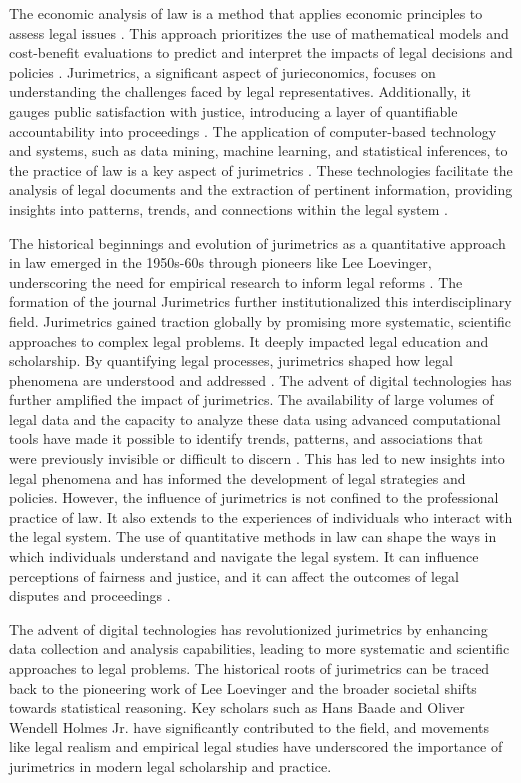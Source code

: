 The economic analysis of law is a method that applies economic principles to assess legal issues \cite{1023071190721}. This approach prioritizes the use of mathematical models and cost-benefit evaluations to predict and interpret the impacts of legal decisions and policies \cite{1023071190721}. Jurimetrics, a significant aspect of jurieconomics, focuses on understanding the challenges faced by legal representatives. Additionally, it gauges public satisfaction with justice, introducing a layer of quantifiable accountability into proceedings \cite{1023071190721}. The application of computer-based technology and systems, such as data mining, machine learning, and statistical inferences, to the practice of law is a key aspect of jurimetrics \cite{1023071190721}. These technologies facilitate the analysis of legal documents and the extraction of pertinent information, providing insights into patterns, trends, and connections within the legal system \cite{1023071190721}.

The historical beginnings and evolution of jurimetrics as a quantitative approach in law emerged in the 1950s-60s through pioneers like Lee Loevinger, underscoring the need for empirical research to inform legal reforms \cite{1023071190721}. The formation of the journal Jurimetrics further institutionalized this interdisciplinary field. Jurimetrics gained traction globally by promising more systematic, scientific approaches to complex legal problems. It deeply impacted legal education and scholarship. By quantifying legal processes, jurimetrics shaped how legal phenomena are understood and addressed \cite{1023071190721}. The advent of digital technologies has further amplified the impact of jurimetrics. The availability of large volumes of legal data and the capacity to analyze these data using advanced computational tools have made it possible to identify trends, patterns, and associations that were previously invisible or difficult to discern \cite{1023071190721}. This has led to new insights into legal phenomena and has informed the development of legal strategies and policies. However, the influence of jurimetrics is not confined to the professional practice of law. It also extends to the experiences of individuals who interact with the legal system. The use of quantitative methods in law can shape the ways in which individuals understand and navigate the legal system. It can influence perceptions of fairness and justice, and it can affect the outcomes of legal disputes and proceedings \cite{1023071190721}.

The advent of digital technologies has revolutionized jurimetrics by enhancing data collection and analysis capabilities, leading to more systematic and scientific approaches to legal problems. The historical roots of jurimetrics can be traced back to the pioneering work of Lee Loevinger and the broader societal shifts towards statistical reasoning. Key scholars such as Hans Baade and Oliver Wendell Holmes Jr. have significantly contributed to the field, and movements like legal realism and empirical legal studies have underscored the importance of jurimetrics in modern legal scholarship and practice.


